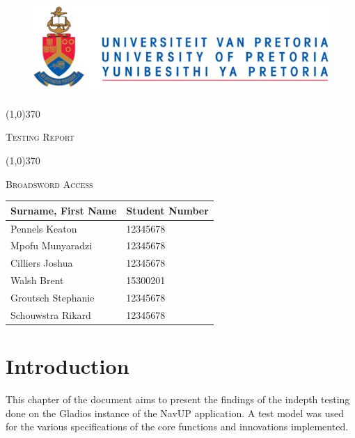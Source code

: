 \documentclass[english]{article}
\begin{document}
	
	\begin{figure}
		\includegraphics[width=\linewidth]{up_logo.png}
	\end{figure}
	
	\begin{center}
	 \line(1,0){370}
	\\[0.2cm]
    {\scshape\Large Testing Report  \par}
	\vspace{0.1cm}
	\line(1,0){370}
	\\[0.8cm]
	
	 {\scshape\Large Broadsword Access \par}
	\vspace{0.9cm}
	
	\begin{tabu} to \textwidth { X[l] X[l]}
		\hline
		\textbf{Surname, First Name  }	& \textbf{Student Number}	\\ \hline \hline
		Pennels 	Keaton   &12345678	\\ \hline
		Mpofu	Munyaradzi   &12345678		\\ \hline
		Cilliers	Joshua   &12345678		\\ \hline
		Walsh     Brent    &15300201		\\ \hline
		Groutsch	Stephanie    &12345678		\\ \hline
		Schouwstra	Rikard    &12345678		\\ \hline
		\hline
	\end{tabu}
	
	\end{center}
	
	
	\newpage
	\tableofcontents

	\newpage
	
	\section{Introduction}

				This chapter of the document aims to present the findings of the indepth testing done on the Gladios instance of the NavUP application. A test model was used for the various specifications of the core functions and innovations implemented.
\end{document}
